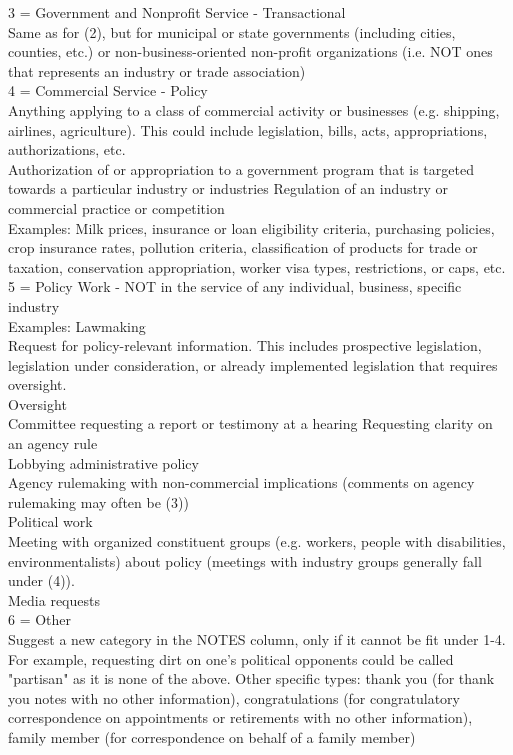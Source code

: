 \documentclass{article}
\begin{document}
3 = Government and Nonprofit Service - Transactional\\
Same as for (2), but for municipal or state governments (including cities, counties, etc.) or non-business-oriented non-profit organizations (i.e. NOT ones that represents an industry or trade association) \\

4 = Commercial Service - Policy \\
Anything applying to a class of commercial activity or businesses (e.g. shipping, airlines, agriculture). This could include legislation, bills, acts, appropriations, authorizations, etc.  \\
Authorization of or appropriation to a government program that is targeted towards a particular industry or industries
Regulation of an industry or commercial practice or competition\\
Examples: Milk prices, insurance or loan eligibility criteria, purchasing policies, crop insurance rates, pollution criteria, classification of products for trade or taxation, conservation appropriation, worker visa types, restrictions, or caps, etc.\\

 
5 = Policy Work - NOT in the service of any individual, business, specific industry\\
Examples: 
Lawmaking \\
Request for policy-relevant information. This includes prospective legislation, legislation under consideration, or already implemented legislation that requires oversight.  \\
Oversight\\
Committee requesting a report or testimony at a hearing
 Requesting clarity on an agency rule\\
Lobbying administrative policy\\
Agency rulemaking with non-commercial implications (comments on agency rulemaking may often be (3)) \\
Political work\\
Meeting with organized constituent groups (e.g. workers, people with disabilities, environmentalists) about policy (meetings with industry groups generally fall under (4)).  \\
Media requests\\

6 = Other \\
	Suggest a new category in the NOTES column, only if it cannot be fit under 1-4. For example, requesting dirt on one's political opponents could be called "partisan" as it is none of the above. Other specific types: thank you (for thank you notes with no other information), congratulations (for congratulatory correspondence on appointments or retirements with no other information), family member (for correspondence on behalf of a family member) \\
\end{document}
